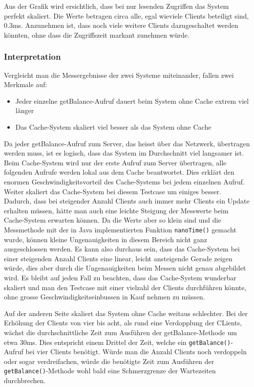 Aus der Grafik wird ersichtlich, dass bei nur lesenden Zu\-griffen das System perfekt skaliert. Die Werte betragen circa alle, egal wieviele Clients beteiligt sind, 0.3ms. Anzunehmen ist, dass noch viele weitere Clients dazugeschaltet werden könnten, ohne dass die Zugriffszeit markant zunehmen würde.


\subsubsection{Interpretation}

Vergleicht man die Messergebnisse der zwei Systeme miteinander, fallen zwei Merkmale auf:
\begin{itemize}
\item Jeder einzelne getBalance-Aufruf dauert beim System ohne Cache extrem viel länger
\item Das Cache-System skaliert viel besser als das System ohne Cache
\end{itemize}

Da jeder getBalance-Aufruf zum Server, das heisst über das Netzwerk, übertragen werden muss, ist es logisch, dass das System im Durchschnitt viel langsamer ist. Beim Cache-System wird nur der erste Aufruf zum Server übertragen, alle folgenden Aufrufe werden lokal aus dem Cache beantwortet. Dies erklärt den enormen Geschwindigkeitsvorteil des Cache-Systems bei jedem einzelnen Aufruf. \newline
Weiter skaliert das Cache-System bei diesem Testcase um einiges besser. Dadurch, dass bei steigender Anzahl Clients auch immer mehr Clients ein Update erhalten müssen, hätte man auch eine leichte Steigung der Messwerte beim Cache-System erwarten können. Da die Werte aber so klein sind und die Messmethode mit der in Java implementierten Funktion \texttt{nanoTime()} gemacht wurde, können kleine Ungenauigkeiten in diesem Bereich nicht ganz ausgeschlossen werden. Es kann also durchaus sein, dass das Cache-System bei einer steigenden Anzahl Clients eine linear, leicht ansteigende Gerade zeigen würde, dies aber durch die Ungenauigkeiten beim Messen nicht genau abgebildet wird. Es bleibt auf jeden Fall zu beachten, dass das Cache-System wunderbar skaliert und man den Testcase mit einer vielzahl der Clients durchführen könnte, ohne grosse Geschwindigkeitseinbussen in Kauf nehmen zu müssen.

Auf der anderen Seite skaliert das System ohne Cache weitaus schlechter. Bei der Erhöhung der Clients von vier bis acht, als rund eine Verdopplung der CLients, wächst die durchschnittliche Zeit zum Ausführen der getBalance-Methode um etwa 30ms. Dies entspricht einem Drittel der Zeit, welche ein \texttt{getBalance()}-Aufruf bei vier Clients benötigt. Würde man die An\-zahl Cli\-ents noch verdoppeln oder sogar verdreifachen, würde die benötigte Zeit zum Ausführen der \texttt{getBalance()}-Methode wohl bald eine Schmerzgrenze der Wartezeiten durchbrechen.

